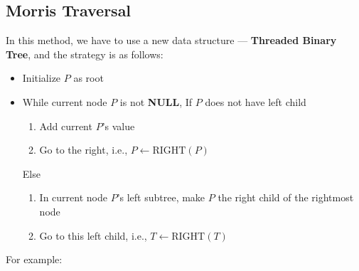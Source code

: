 \subsection{Morris Traversal}
In this method, we have to use a new data structure --- \textbf{Threaded Binary Tree}, and the strategy is as follows:
\begin{itemize}
    \item Initialize $P$ as root
    \item While current node $P$ is not \textbf{NULL}, If $P$ does not have left child
    \begin{enumerate}
        \item Add current $P$’s value
        \item Go to the right, i.e., $P \gets \text{RIGHT}(P)$
    \end{enumerate}
    Else
    \begin{enumerate}
        \item In current node $P$'s left subtree, make $P$ the right child of the rightmost node
        \item Go to this left child, i.e., $T\gets \text{RIGHT}(T)$
    \end{enumerate}
\end{itemize}
For example:
\begin{figure}[H]
\end{figure}
